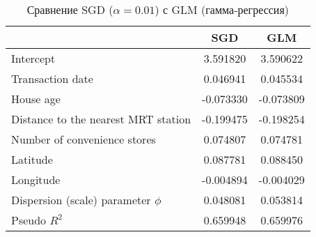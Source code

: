 \documentclass{article}
\begin{document}
\begin{table}[h]
    \caption{Сравнение \textsf{SGD} ($\alpha=0.01$) с \textsf{GLM} (гамма-регрессия)}
    \centering
    \begin{tabular}{|l|c|c|}
        \hline
                                            & \textsf{SGD} & \textsf{GLM} \\
        \hline
        Intercept                           & 3.591820     & 3.590622     \\
        Transaction date                    & 0.046941     & 0.045534     \\
        House age                           & -0.073330    & -0.073809    \\
        Distance to the nearest MRT station & -0.199475    & -0.198254    \\
        Number of convenience stores        & 0.074807     & 0.074781     \\
        Latitude                            & 0.087781     & 0.088450     \\
        Longitude                           & -0.004894    & -0.004029    \\
        Dispersion (scale) parameter $\phi$ & 0.048081     & 0.053814     \\
        \hhline{===}
        Pseudo $R^2$                        & 0.659948     & 0.659976     \\
        \hline
    \end{tabular}
    \label{tab:real_estate_glm}
\end{table}
\end{document}
